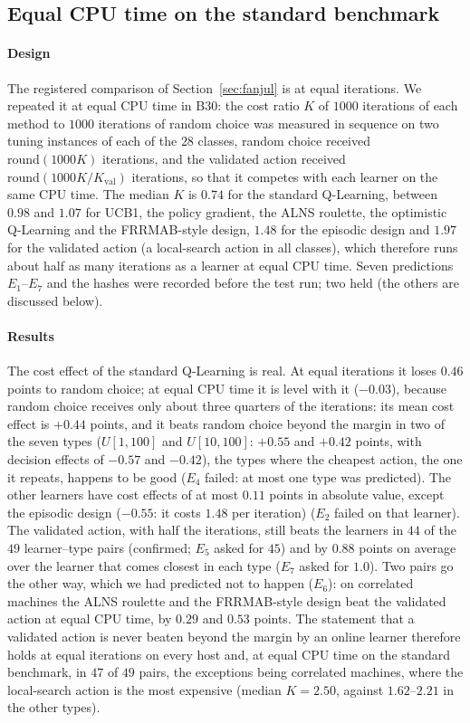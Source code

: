 \subsection{Equal CPU time on the standard benchmark}
\label{sec:eqcpu}
\paragraph{Design} The registered comparison of Section~\ref{sec:fanjul} is at equal iterations. We repeated it at equal CPU time in B30: the cost ratio $K$ of $1000$ iterations of each method to $1000$ iterations of random choice was measured in sequence on two tuning instances of each of the $28$ classes, random choice received $\mathrm{round}(1000K)$ iterations, and the validated action received $\mathrm{round}(1000K/K_{\mathrm{val}})$ iterations, so that it competes with each learner on the same CPU time. The median $K$ is $0.74$ for the standard Q-Learning, between $0.98$ and $1.07$ for UCB1, the policy gradient, the ALNS roulette, the optimistic Q-Learning and the FRRMAB-style design, $1.48$ for the episodic design and $1.97$ for the validated action (a local-search action in all classes), which therefore runs about half as many iterations as a learner at equal CPU time. Seven predictions $E_1$--$E_7$ and the hashes were recorded before the test run; two held (the others are discussed below).

\paragraph{Results} The cost effect of the standard Q-Learning is real. At equal iterations it loses $0.46$ points to random choice; at equal CPU time it is level with it ($-0.03$), because random choice receives only about three quarters of the iterations: its mean cost effect is $+0.44$ points, and it beats random choice beyond the margin in two of the seven types ($U[1,100]$ and $U[10,100]$: $+0.55$ and $+0.42$ points, with decision effects of $-0.57$ and $-0.42$), the types where the cheapest action, the one it repeats, happens to be good ($E_4$ failed: at most one type was predicted). The other learners have cost effects of at most $0.11$ points in absolute value, except the episodic design ($-0.55$: it costs $1.48$ per iteration) ($E_2$ failed on that learner). The validated action, with half the iterations, still beats the learners in $44$ of the $49$ learner--type pairs (confirmed; $E_5$ asked for $45$) and by $0.88$ points on average over the learner that comes closest in each type ($E_7$ asked for $1.0$). Two pairs go the other way, which we had predicted not to happen ($E_6$): on correlated machines the ALNS roulette and the FRRMAB-style design beat the validated action at equal CPU time, by $0.29$ and $0.53$ points. The statement that a validated action is never beaten beyond the margin by an online learner therefore holds at equal iterations on every host and, at equal CPU time on the standard benchmark, in $47$ of $49$ pairs, the exceptions being correlated machines, where the local-search action is the most expensive (median $K=2.50$, against $1.62$--$2.21$ in the other types).
